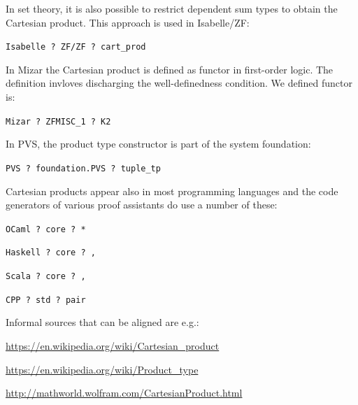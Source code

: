 In set theory, it is also possible to restrict dependent sum types to obtain the Cartesian product. This approach is used in Isabelle/ZF:

\begin{compactitem}
\item \texttt{Isabelle ? ZF/ZF ? cart\_prod}
\end{compactitem}

In Mizar the Cartesian product is defined as functor in first-order logic. The definition invloves discharging the well-definedness condition. We defined functor is:
\begin{compactitem}
\item \texttt{Mizar ? ZFMISC\_1 ? K2}
\end{compactitem}

In PVS, the product type constructor is part of the system foundation:
\begin{compactitem}
\item \texttt{PVS ? foundation.PVS ? tuple\_tp}
\end{compactitem}

Cartesian products appear also in most programming languages and the code generators
of various proof assistants do use a number of these:
\begin{compactitem}
\item \texttt{OCaml ? core ? * }
\item \texttt{Haskell ? core ? , }
\item \texttt{Scala ? core ? , }
\item \texttt{CPP ? std ? pair }
\end{compactitem}

Informal sources that can be aligned are e.g.:
\begin{compactitem}
\item \small \url{https://en.wikipedia.org/wiki/Cartesian_product}
\item \small \url{https://en.wikipedia.org/wiki/Product_type}
\item \footnotesize \url{http://mathworld.wolfram.com/CartesianProduct.html}
\end{compactitem}



